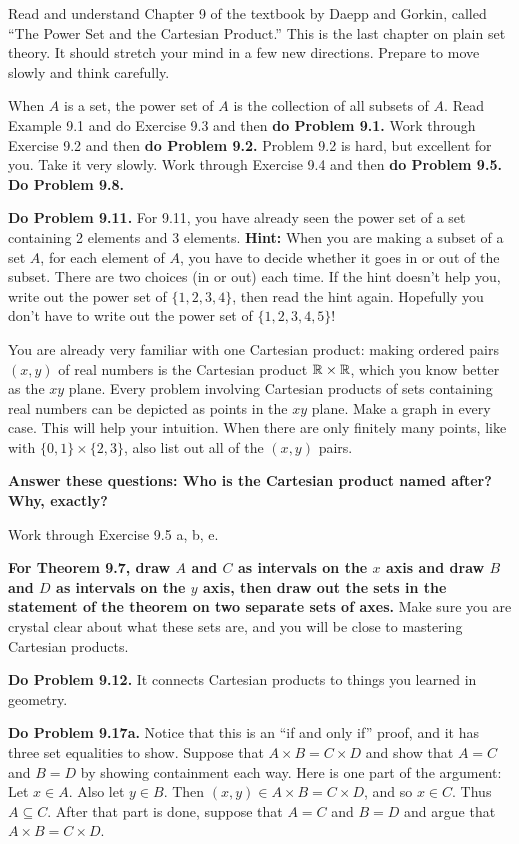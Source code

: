 
Read and understand Chapter 9 of the textbook by Daepp and Gorkin, called ``The Power Set and the Cartesian Product.''
This is the last chapter on plain set theory.
It should stretch your mind in a few new directions.
Prepare to move slowly and think carefully.

When $A$ is a set, the power set of $A$ is the collection of all subsets of $A$.  Read Example 9.1 and do Exercise 9.3 and then {\bf do Problem 9.1.}
Work through Exercise 9.2 and then {\bf do Problem 9.2.}
Problem 9.2 is hard, but excellent for you.  Take it very slowly.
Work through Exercise 9.4 and then {\bf do Problem 9.5.}
{\bf Do Problem 9.8.}

{\bf Do Problem 9.11.}  For 9.11, you have already seen the power set of a set containing 2 elements and 3 elements.  {\bf Hint:}  When you are making a subset of a set $A$, for each element of $A$, you have to decide whether it goes in or out of the subset.  There are two choices (in or out) each time.  If the hint doesn't help you, write out the power set of $\{1, 2, 3, 4\}$, then read the hint again.  Hopefully you don't have to write out the power set of $\{1, 2, 3, 4, 5\}!$

You are already very familiar with one Cartesian product:  making ordered pairs $(x,y)$ of real numbers is the Cartesian product $\mathbb{R} \times \mathbb{R}$, which you know better as the $xy$ plane.
Every problem involving Cartesian products of sets containing real numbers can be depicted as points in the $xy$ plane.
Make a graph in every case.
This will help your intuition.
When there are only finitely many points, like with $\{0,1\} \times \{ 2,3\}$, also list out all of the $(x,y)$ pairs.

{\bf Answer these questions:  Who is the Cartesian product named after?  Why, exactly?}

Work through Exercise 9.5 a, b, e.

{\bf For Theorem 9.7, draw $A$ and $C$ as intervals on the $x$ axis and draw $B$ and $D$ as intervals on the $y$ axis, then draw out the sets in the statement of the theorem on two separate sets of axes.}
Make sure you are crystal clear about what these sets are, and you will be close to mastering Cartesian products.

{\bf Do Problem 9.12.}  It connects Cartesian products to things you learned in geometry.

{\bf Do Problem 9.17a.}  Notice that this is an ``if and only if'' proof, and it has three set equalities to show.
Suppose that $A \times B = C \times D$ and show that $A = C$ and $B = D$ by showing containment each way.
Here is one part of the argument:  Let $x \in A$.  Also let $y \in B$.  Then $(x,y) \in A \times B = C \times D$, and so $x \in C$.  Thus $A \subseteq C$.
After that part is done, suppose that $A=C$ and $B=D$ and argue that $A \times B = C \times D$.

